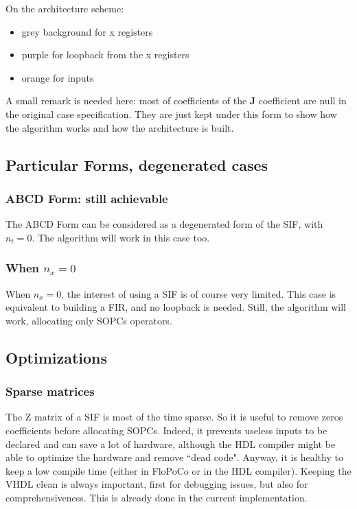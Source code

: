 	On the architecture scheme:
	\begin{itemize}
		\item grey background for x registers
		\item purple for loopback from the x registers
		\item orange for inputs
	\end{itemize}
	
	A small remark is needed here:
	most of coefficients of the $\boldsymbol{J}$ coefficient are null in the original case specification.
	They are just kept under this form to show how the algorithm works and how the architecture is built.
	

\subsection{Particular Forms, degenerated cases}
	\subsubsection{ABCD Form: still achievable}
	The ABCD Form can be considered as a degenerated form of the SIF, with $n_t=0$.
	The algorithm will work in this case too.
	\subsubsection{When $n_x=0$}
	When $n_x=0$, the interest of using a SIF is of course very limited.
	This case is equivalent to building a FIR, and no loopback is needed.
	Still, the algorithm will work, allocating only SOPCs operators.
	
\subsection{Optimizations}
	\subsubsection{Sparse matrices}
		The Z matrix of a SIF is most of the time sparse.
		So it is useful to remove zeros coefficients before allocating SOPCs.
		Indeed, it prevents useless inputs to be declared and can save a lot of hardware,
		although the HDL compiler might be able to optimize the hardware and remove ``dead code".
		Anyway, it is healthy to keep a low compile time (either in FloPoCo or in the HDL compiler).
		Keeping the VHDL clean is always important, first for debugging issues, but also for comprehensiveness.
		This is already done in the current implementation.

